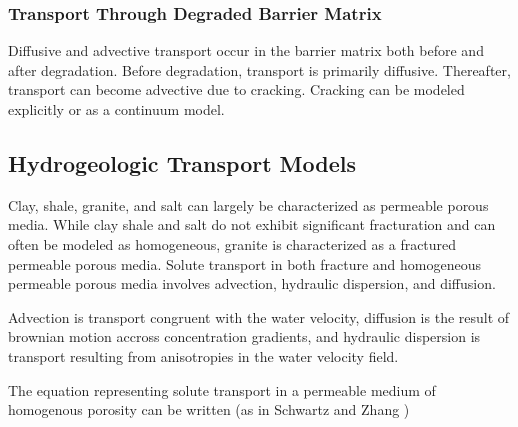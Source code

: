 \subsubsection{Transport Through Degraded Barrier Matrix}

Diffusive and advective transport occur in the barrier matrix both before and 
after degradation. Before degradation, transport is primarily diffusive. 
Thereafter, transport can become advective due to cracking. Cracking can be 
modeled explicitly or as a continuum model.  


\subsection{Hydrogeologic Transport Models}
Clay, shale, granite, and salt can largely be characterized as permeable porous 
media. While clay shale and salt do not exhibit significant fracturation and can 
often be modeled as homogeneous, granite is  characterized as a fractured 
permeable porous media.  Solute transport in both fracture and homogeneous 
permeable porous media involves advection, hydraulic dispersion, and diffusion. 

Advection is transport congruent with the water velocity, diffusion is the 
result of brownian motion accross concentration gradients, and hydraulic 
dispersion is transport resulting from anisotropies in the water velocity field. 








The equation representing solute transport in a permeable medium of homogenous
porosity can be written (as in Schwartz and Zhang 
\cite{schwartz_fundamentals_2004})

